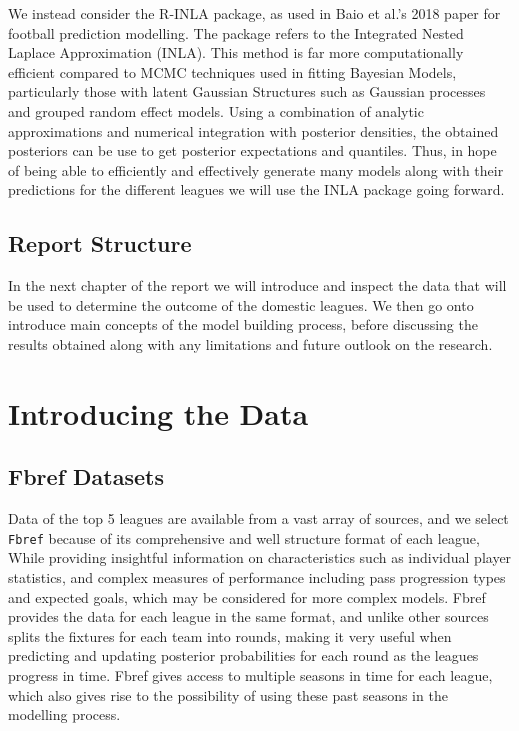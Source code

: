 \documentclass[
]{article}
\begin{document}
We instead consider the R-INLA package, as used in Baio et al.'s 2018
paper for football prediction modelling. The package refers to the
Integrated Nested Laplace Approximation (INLA). This method is far more
computationally efficient compared to MCMC techniques used in fitting
Bayesian Models, particularly those with latent Gaussian Structures such
as Gaussian processes and grouped random effect models. Using a
combination of analytic approximations and numerical integration with
posterior densities, the obtained posteriors can be use to get posterior
expectations and quantiles. Thus, in hope of being able to efficiently
and effectively generate many models along with their predictions for
the different leagues we will use the INLA package going forward.

\hypertarget{report-structure}{%
\subsection{Report Structure}\label{report-structure}}

In the next chapter of the report we will introduce and inspect the data
that will be used to determine the outcome of the domestic leagues. We
then go onto introduce main concepts of the model building process,
before discussing the results obtained along with any limitations and
future outlook on the research.

\hypertarget{introducing-the-data}{%
\section{Introducing the Data}\label{introducing-the-data}}

\hypertarget{fbref-datasets}{%
\subsection{Fbref Datasets}\label{fbref-datasets}}

Data of the top 5 leagues are available from a vast array of sources,
and we select \texttt{Fbref} because of its comprehensive and well
structure format of each league, While providing insightful information
on characteristics such as individual player statistics, and complex
measures of performance including pass progression types and expected
goals, which may be considered for more complex models. Fbref provides
the data for each league in the same format, and unlike other sources
splits the fixtures for each team into rounds, making it very useful
when predicting and updating posterior probabilities for each round as
the leagues progress in time. Fbref gives access to multiple seasons in
time for each league, which also gives rise to the possibility of using
these past seasons in the modelling process.
\end{document}
